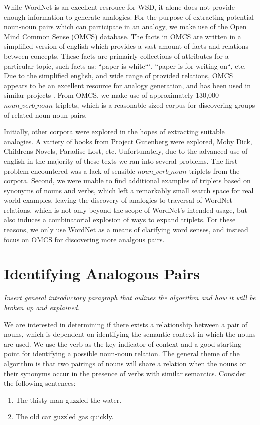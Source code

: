 \documentclass[11pt]{article}
\begin{document}
While WordNet is an excellent resrouce for WSD, it alone does not provide enough
information to generate analogies.  For the purpose of extracting potential
noun-noun pairs which can participate in an analogy, we make use of the Open
Mind Common Sense (OMCS) database.  The facts in OMCS are written in a simplified version of
english which provides a vast amount of facts and relations between concepts.
These facts are primairly collections of attributes for a particular topic, such
facts as: ``paper is white```, ``paper is for writing on``, etc.  Due to the
simplified english, and wide range of provided relations, OMCS appears to be an
excellent resource for analogy generation, and has been used in similar projects
\cite{speer08analogyspace}.  From OMCS, we make use of approximately 130,000
$noun\_verb\_noun$ triplets, which is a reasonable sized corpus for discovering
groups of related noun-noun pairs.


Initially, other corpora were explored in the hopes of extracting suitable
analogies.  A variety of books from Project Gutenberg were explored, Moby Dick,
Childrens Novels, Paradise Lost, etc.  Unfortunately, due to the advanced use of
english in the majority of these texts we ran into several problems.  The first
problem encountered was a lack of sensible $noun\_verb\_noun$ triplets from the
corpora.  Second, we were unable to find additional examples of triplets based
on synonyms of nouns and verbs, which left a remarkably small search space for
real world examples, leaving the discovery of analogies to traversal of WordNet
relations, which is not only beyond the scope of WordNet's intended usage, but
also induces a combinatorial explosion of ways to expand triplets.  For these
reasons, we only use WordNet as a means of clarifying word senses, and instead
focus on OMCS for discovering more analgous pairs.

\section{Identifying Analogous Pairs}
\label{sec:identifying}

\emph{Insert general introductory paragraph that oulines the algorithm and how
  it will be broken up and explained}.

We are interested in determining if there exists a relationship between a pair
of nouns, which is dependent on identifying the semantic context in which the
nouns are used.  We use the verb as the key indicator of context and a good
starting point for identifying a possible noun-noun relation.  The general theme
of the algorithm is that two pairings of nouns will share a relation when the
nouns or their synonyms occur in the presence of verbs with similar semantics.
Consider the following sentences:
\begin{enumerate}
  \item The thisty man guzzled the water.
  \item The old car guzzled gas quickly.
\end{enumerate}
\end{document}
